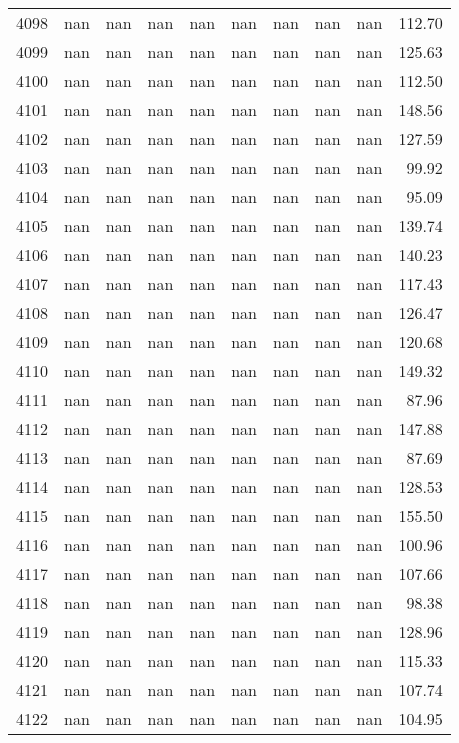 \begin{tabular}{lrrrrrrrrr}
4098 & nan & nan & nan & nan & nan & nan & nan & nan & 112.70 \\
4099 & nan & nan & nan & nan & nan & nan & nan & nan & 125.63 \\
4100 & nan & nan & nan & nan & nan & nan & nan & nan & 112.50 \\
4101 & nan & nan & nan & nan & nan & nan & nan & nan & 148.56 \\
4102 & nan & nan & nan & nan & nan & nan & nan & nan & 127.59 \\
4103 & nan & nan & nan & nan & nan & nan & nan & nan & 99.92 \\
4104 & nan & nan & nan & nan & nan & nan & nan & nan & 95.09 \\
4105 & nan & nan & nan & nan & nan & nan & nan & nan & 139.74 \\
4106 & nan & nan & nan & nan & nan & nan & nan & nan & 140.23 \\
4107 & nan & nan & nan & nan & nan & nan & nan & nan & 117.43 \\
4108 & nan & nan & nan & nan & nan & nan & nan & nan & 126.47 \\
4109 & nan & nan & nan & nan & nan & nan & nan & nan & 120.68 \\
4110 & nan & nan & nan & nan & nan & nan & nan & nan & 149.32 \\
4111 & nan & nan & nan & nan & nan & nan & nan & nan & 87.96 \\
4112 & nan & nan & nan & nan & nan & nan & nan & nan & 147.88 \\
4113 & nan & nan & nan & nan & nan & nan & nan & nan & 87.69 \\
4114 & nan & nan & nan & nan & nan & nan & nan & nan & 128.53 \\
4115 & nan & nan & nan & nan & nan & nan & nan & nan & 155.50 \\
4116 & nan & nan & nan & nan & nan & nan & nan & nan & 100.96 \\
4117 & nan & nan & nan & nan & nan & nan & nan & nan & 107.66 \\
4118 & nan & nan & nan & nan & nan & nan & nan & nan & 98.38 \\
4119 & nan & nan & nan & nan & nan & nan & nan & nan & 128.96 \\
4120 & nan & nan & nan & nan & nan & nan & nan & nan & 115.33 \\
4121 & nan & nan & nan & nan & nan & nan & nan & nan & 107.74 \\
4122 & nan & nan & nan & nan & nan & nan & nan & nan & 104.95 \\

\end{tabular}
